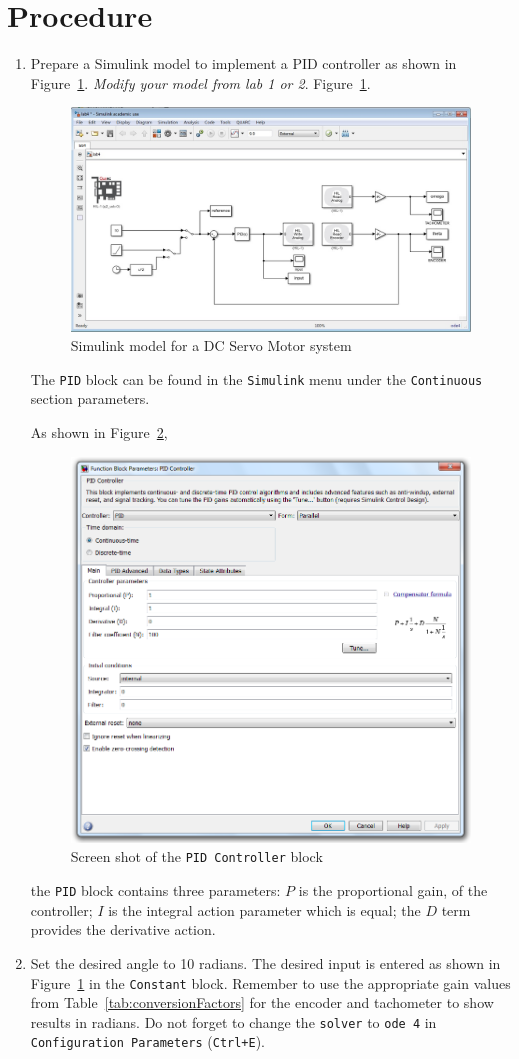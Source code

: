 \section{Procedure}

\begin{enumerate}
    \item Prepare a \textsf{Simulink} model to implement a PID controller as
          shown in Figure~\ref{fig:model6}\@. \emph{Modify your model from lab 1 or 2}.
          Figure~\ref{fig:model6}\@.
          \begin{figure}[htbp]
              \centering
              \includegraphics[width=0.6\hsize]{pix/performanceSpecificationModel4.jpg}
              \caption{\textsf{Simulink} model for a DC Servo Motor
                  system}\label{fig:model6}
          \end{figure}%
          The \verb|PID| block can be found in the \verb|Simulink| menu under the
          \verb|Continuous| section parameters.

          As shown in Figure~\ref{fig:PIDparameters}\@,
          \begin{figure}[htbp]
              \centering
              \includegraphics[width=0.6\hsize]{pix/PID.PNG}
              \caption{Screen shot of the \texttt{PID Controller} block}\label{fig:PIDparameters}
          \end{figure}%
          the \verb|PID| block contains three parameters: \(P\) is the proportional gain, of the controller; \(I\) is the integral action parameter which is equal; the \(D\) term provides the derivative action.
    \item\label{step:2} Set the desired angle to 10 radians.  The desired input is entered as
          shown in Figure~\ref{fig:model6} in the \verb|Constant| block. Remember to
          use the appropriate gain values from Table~\ref{tab:conversionFactors} for
          the encoder and tachometer to show results in radians.  Do not forget to
          change the \verb|solver| to \verb|ode 4| in \verb|Configuration Parameters|
          (\verb|Ctrl+E|).


\end{enumerate}
